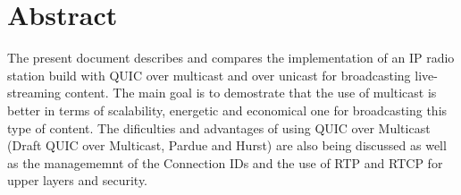 \section*{Abstract}

{
    The present document describes and compares the implementation of an \ac{IP} radio station build with QUIC over multicast and over 
    unicast for broadcasting live-streaming content. The main goal is to demostrate that the use of multicast is better in terms of scalability,
    energetic and economical one for broadcasting this type of content. The dificulties and advantages of using QUIC over Multicast (Draft QUIC
    over Multicast, Pardue and Hurst) are also being discussed as well as the managememnt of the Connection IDs and the use of \ac{RTP} and 
    \ac{RTCP} for upper layers and security.
}
